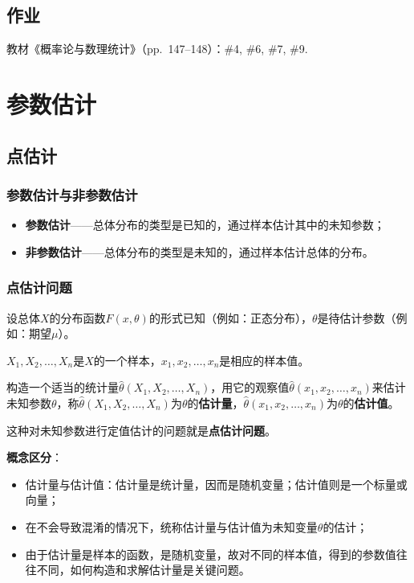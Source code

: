 \documentclass[11pt,a4paper]{report}
\theoremstyle{definition}
\begin{document}
\section*{作业}

教材《概率论与数理统计》（pp.~147--148）：\#4, \#6, \#7, \#9.

\newpage
\chapter{参数估计}

\section{点估计}

\subsection{参数估计与非参数估计}

\begin{itemize}[leftmargin=2em]
    \item \textbf{参数估计}——总体分布的类型是已知的，通过样本估计其中的未知参数；
    \item \textbf{非参数估计}——总体分布的类型是未知的，通过样本估计总体的分布。
\end{itemize}

\subsection{点估计问题}

设总体$X$的分布函数$F(x,\theta)$的形式已知（例如：正态分布），$\theta$是待估计参数（例如：期望$\mu$）。

$X_{1},X_{2},\ldots,X_{n}$是$X$的一个样本，$x_{1},x_{2},\ldots,x_{n}$是相应的样本值。

构造一个适当的统计量$\hat{\theta}(X_{1},X_{2},\ldots,X_{n})$，用它的观察值$\hat{\theta}(x_{1},x_{2},\ldots,x_{n})$来估计未知参数$\theta$，称$\hat{\theta}(X_{1},X_{2},\ldots,X_{n})$为$\theta$的\textbf{估计量}，$\hat{\theta}(x_{1},x_{2},\ldots,x_{n})$为$\theta$的\textbf{估计值}。

这种对未知参数进行定值估计的问题就是\textbf{点估计问题}。

\textbf{概念区分}：
\begin{itemize}[leftmargin=2em]
    \item 估计量与估计值：估计量是统计量，因而是随机变量；估计值则是一个标量或向量；
    \item 在不会导致混淆的情况下，统称估计量与估计值为未知变量$\theta$的估计；
    \item 由于估计量是样本的函数，是随机变量，故对不同的样本值，得到的参数值往往不同，如何构造和求解估计量是关键问题。
\end{itemize}
\end{document}
